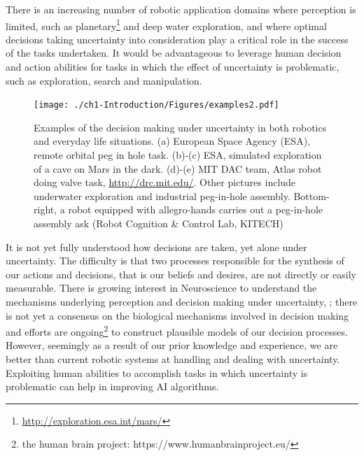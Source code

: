 There is an increasing number of robotic application domains where perception is limited, such as planetary\footnote{\url{http://exploration.esa.int/mars/}} 
and deep water exploration, and where optimal decisions taking uncertainty into consideration play a critical role in the success of the tasks undertaken. 
It would be advantageous to leverage human decision and action abilities for tasks in which the effect of uncertainty is problematic, such as exploration, search and manipulation.

\begin{figure}
 \centering
 \texttt{[image: ./ch1-Introduction/Figures/examples2.pdf]}
 \caption{Examples of the decision making under uncertainty in both robotics and everyday life situations. (a) European Space Agency (ESA), remote orbital peg in hole task. (b)-(c) 
 ESA, simulated exploration of a cave on Mars in the dark. (d)-(e) MIT DAC team, Atlas robot doing valve task, \url{http://drc.mit.edu/}. Other pictures include underwater 
 exploration and industrial peg-in-hole assembly. Bottom-right, a robot equipped with allegro-hands carries out a peg-in-hole assembly ask (Robot Cognition \& Control Lab, KITECH)}
 \label{fig:ch1-example}
\end{figure}

It is not yet fully understood how decisions are taken, yet alone under uncertainty. The difficulty is that two processes responsible 
for the synthesis of our actions and decisions, that is our beliefs and desires, are not directly or easily measurable. There is growing interest in 
Neuroscience to understand the mechanisms underlying perception and decision making under uncertainty, \citep{decision_un_2013}; there is not 
yet a consensus on the biological mechanisms involved in decision making and efforts are ongoing\footnote{the human brain project: https://www.humanbrainproject.eu/} 
to construct plausible models of our decision processes. However, seemingly as a result of our prior knowledge and experience, 
we are better than current robotic systems at handling and dealing with uncertainty. Exploiting human abilities to accomplish 
tasks in which uncertainty is problematic can help in improving AI algorithms.

